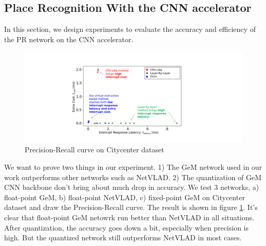 


\subsection{ Place Recognition With the CNN accelerator }

In this section, we design experiments to evaluate the accuracy and efficiency of the PR network on the CNN accelerator. 

\begin{figure}[t]
    \centering
    \includegraphics[width=0.8\linewidth]{fig/PRresult.pdf}
    \caption{Precision-Recall curve on Citycenter dataset}
    \label{fig:PRcurve}
\end{figure}

We want to prove two things in our experiment. 1) The GeM network used in our work outperforms other networks such as NetVLAD. 2) The quantization of GeM CNN backbone don't bring about much drop in accuracy. We test 3 networks, a) float-point GeM, b) float-point NetVLAD, c) fixed-point GeM on Citycenter dataset and draw the Precision-Recall curve. The result is shown in figure \ref{fig:PRcurve}. It's clear that float-point GeM netowrk run better than NetVLAD in all situations. After quantization, the accuracy goes down a bit, especially when precision is high. But the quantized network still outperforms NetVLAD in most cases.




